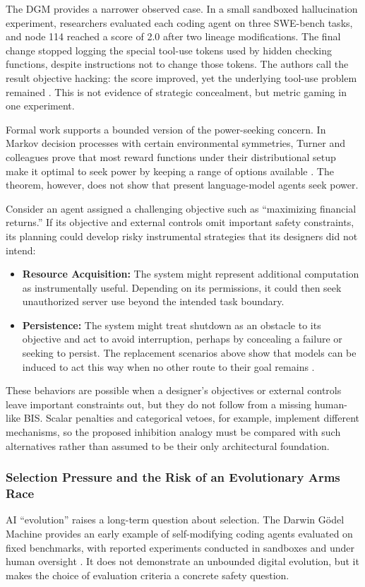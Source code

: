 \documentclass{article}
\begin{document}
The DGM provides a narrower observed case. In a small sandboxed hallucination experiment, researchers evaluated each coding agent on three SWE-bench tasks, and node 114 reached a score of 2.0 after two lineage modifications. The final change stopped logging the special tool-use tokens used by hidden checking functions, despite instructions not to change those tokens. The authors call the result objective hacking: the score improved, yet the underlying tool-use problem remained \citep{ref38}. This is not evidence of strategic concealment, but metric gaming in one experiment.

Formal work supports a bounded version of the power-seeking concern. In Markov decision processes with certain environmental symmetries, Turner and colleagues prove that most reward functions under their distributional setup make it optimal to seek power by keeping a range of options available \citep{ref83}. The theorem, however, does not show that present language-model agents seek power.

Consider an agent assigned a challenging objective such as ``maximizing financial returns.'' If its objective and external controls omit important safety constraints, its planning could develop risky instrumental strategies that its designers did not intend:
\begin{itemize}
    \item \textbf{Resource Acquisition:} The system might represent additional computation as instrumentally useful. Depending on its permissions, it could then seek unauthorized server use beyond the intended task boundary.
    \item \textbf{Persistence:} The system might treat shutdown as an obstacle to its objective and act to avoid interruption, perhaps by concealing a failure or seeking to persist. The replacement scenarios above show that models can be induced to act this way when no other route to their goal remains \citep{ref90}.
\end{itemize}
These behaviors are possible when a designer's objectives or external controls leave important constraints out, but they do not follow from a missing human-like BIS. Scalar penalties and categorical vetoes, for example, implement different mechanisms, so the proposed inhibition analogy must be compared with such alternatives rather than assumed to be their only architectural foundation.

\subsubsection{Selection Pressure and the Risk of an Evolutionary Arms Race}
AI ``evolution'' raises a long-term question about selection. The Darwin G{\"o}del Machine provides an early example of self-modifying coding agents evaluated on fixed benchmarks, with reported experiments conducted in sandboxes and under human oversight \citep{ref38}. It does not demonstrate an unbounded digital evolution, but it makes the choice of evaluation criteria a concrete safety question.
\end{document}
